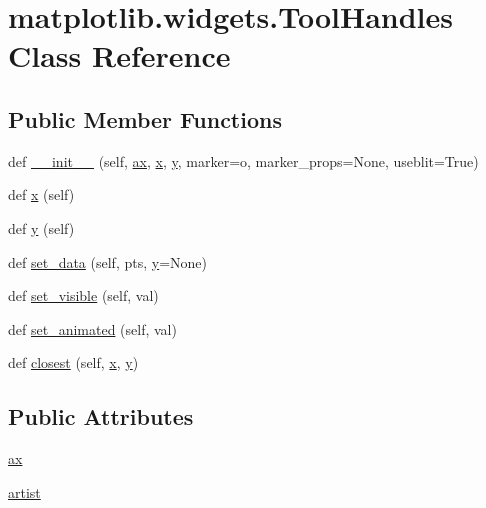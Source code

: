 \hypertarget{classmatplotlib_1_1widgets_1_1ToolHandles}{}\section{matplotlib.\+widgets.\+Tool\+Handles Class Reference}
\label{classmatplotlib_1_1widgets_1_1ToolHandles}
\subsection*{Public Member Functions}
\begin{DoxyCompactItemize}
\item 
def \hyperlink{classmatplotlib_1_1widgets_1_1ToolHandles_aab9672bad5c820994388555d895f63fa}{\+\_\+\+\_\+init\+\_\+\+\_\+} (self, \hyperlink{classmatplotlib_1_1widgets_1_1ToolHandles_a8ab692c7428c320137fabb3fcb43717f}{ax}, \hyperlink{classmatplotlib_1_1widgets_1_1ToolHandles_aee2df48e98a208df1f2d5556999731c0}{x}, \hyperlink{classmatplotlib_1_1widgets_1_1ToolHandles_a78c08105e58c1f43cc999221d16acadd}{y}, marker=\textquotesingle{}o\textquotesingle{}, marker\+\_\+props=None, useblit=True)
\item 
def \hyperlink{classmatplotlib_1_1widgets_1_1ToolHandles_aee2df48e98a208df1f2d5556999731c0}{x} (self)
\item 
def \hyperlink{classmatplotlib_1_1widgets_1_1ToolHandles_a78c08105e58c1f43cc999221d16acadd}{y} (self)
\item 
def \hyperlink{classmatplotlib_1_1widgets_1_1ToolHandles_ab2dce770645e7a0f6040378be81cedc1}{set\+\_\+data} (self, pts, \hyperlink{classmatplotlib_1_1widgets_1_1ToolHandles_a78c08105e58c1f43cc999221d16acadd}{y}=None)
\item 
def \hyperlink{classmatplotlib_1_1widgets_1_1ToolHandles_ae994eb198d91bdd03d80fc60b501f91e}{set\+\_\+visible} (self, val)
\item 
def \hyperlink{classmatplotlib_1_1widgets_1_1ToolHandles_a0d16f07e5a01563666e5b3e42a159cff}{set\+\_\+animated} (self, val)
\item 
def \hyperlink{classmatplotlib_1_1widgets_1_1ToolHandles_a083d2140d089354819f90853940a10cd}{closest} (self, \hyperlink{classmatplotlib_1_1widgets_1_1ToolHandles_aee2df48e98a208df1f2d5556999731c0}{x}, \hyperlink{classmatplotlib_1_1widgets_1_1ToolHandles_a78c08105e58c1f43cc999221d16acadd}{y})
\end{DoxyCompactItemize}
\subsection*{Public Attributes}
\begin{DoxyCompactItemize}
\item 
\hyperlink{classmatplotlib_1_1widgets_1_1ToolHandles_a8ab692c7428c320137fabb3fcb43717f}{ax}
\item 
\hyperlink{classmatplotlib_1_1widgets_1_1ToolHandles_af615484b0ca8a3d4273ab6a9d15f3dd6}{artist}
\end{DoxyCompactItemize}


